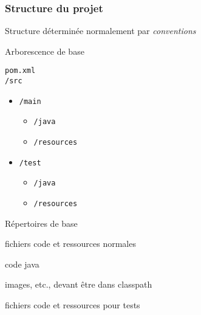 \documentclass[english, french]{beamer}
\begin{document}
\begin{frame}
	\frametitle{Structure du projet}
	Structure déterminée {\tiny normalement} par \emph{conventions}
	\vfill
	\begin{minipage}[t]{3.5cm}
		{\centering Arborescence de base\par}
		\vspace{1ex}
		\texttt{pom.xml}\\
		\texttt{/src}
		\begin{itemize}
			\item[] \texttt{/main}
			\begin{itemize}
				\item[] \texttt{/java}
			\end{itemize}\vspace{-0.8ex}
			\begin{itemize}
				\item[] \texttt{/resources}
			\end{itemize}\vspace{-0.8ex}
			\item[] \texttt{/test}
			\begin{itemize}
				\item[] \texttt{/java}
			\end{itemize}\vspace{-0.8ex}
			\begin{itemize}
				\item[] \texttt{/resources}
			\end{itemize}\vspace{-0.8ex}
		\end{itemize}
	\end{minipage}\hfill%
	\begin{minipage}[t]{6.5cm}
		{\centering Répertoires de base\par}
		\begin{description}
			\item[\texttt{/src/main/…}] fichiers code et ressources \og{}normales\fg{}
			\item[\texttt{…/java}] code java
			\item[\texttt{…/resources}] images, etc., devant être dans classpath
			\item[\texttt{/src/test/…}] fichiers code et ressources pour tests
		\end{description}
	\end{minipage}
\end{frame}
\end{document}
